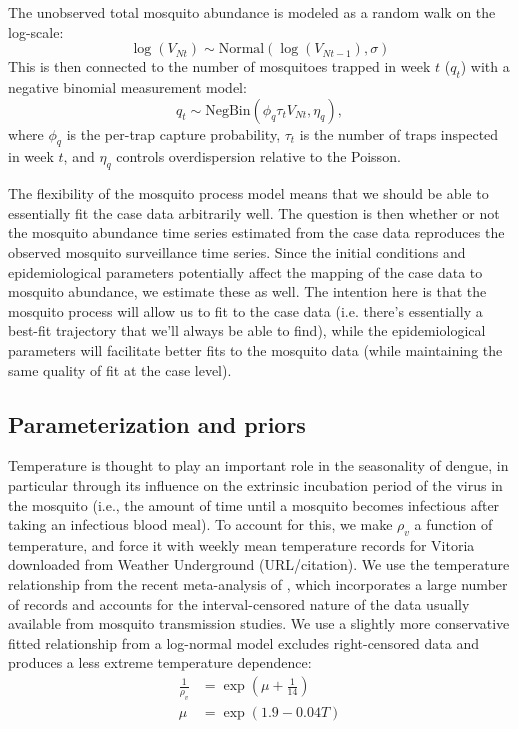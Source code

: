 \documentclass[10pt,letterpaper]{article}
\begin{document}
The unobserved total mosquito abundance is modeled as a random walk on the log-scale:
\begin{equation}
\log(V_{Nt}) \sim \text{Normal}(\log(V_{Nt-1}), \sigma)
\end{equation}
This is then connected to the number of mosquitoes trapped in week $t$ ($q_t$) with a negative binomial measurement model:
\begin{equation}
q_t \sim \text{NegBin}(\phi_q \tau_t V_{Nt}, \eta_q),
\end{equation}
where $\phi_q$ is the per-trap capture probability, $\tau_t$ is the number of traps inspected in week $t$, and $\eta_q$ controls overdispersion relative to the Poisson.

The flexibility of the mosquito process model means that we should be able to essentially fit the case data arbitrarily well.
The question is then whether or not the mosquito abundance time series estimated from the case data reproduces the observed mosquito surveillance time series.
Since the initial conditions and epidemiological parameters potentially affect the mapping of the case data to mosquito abundance, we estimate these as well.
The intention here is that the mosquito process will allow us to fit to the case data (i.e. there's essentially a best-fit trajectory that we'll always be able to find), while the epidemiological parameters will facilitate better fits to the mosquito data (while maintaining the same quality of fit at the case level).

\subsection*{Parameterization and priors}

Temperature is thought to play an important role in the seasonality of dengue, in particular through its influence on the extrinsic incubation period of the virus in the mosquito (i.e., the amount of time until a mosquito becomes infectious after taking an infectious blood meal).
To account for this, we make $\rho_v$ a function of temperature, and force it with weekly mean temperature records for Vitoria downloaded from Weather Underground (URL/citation).
We use the temperature relationship from the recent meta-analysis of \cite{Chan2012}, which incorporates a large number of records and accounts for the interval-censored nature of the data usually available from mosquito transmission studies.
We use a slightly more conservative fitted relationship from a log-normal model excludes right-censored data and produces a less extreme temperature dependence:
\begin{align}
\frac{1}{\rho_v} &= \exp \left(\mu + \frac{1}{14}\right)\\
\mu & = \exp(1.9 - 0.04 T)\\
\end{align}
\end{document}
